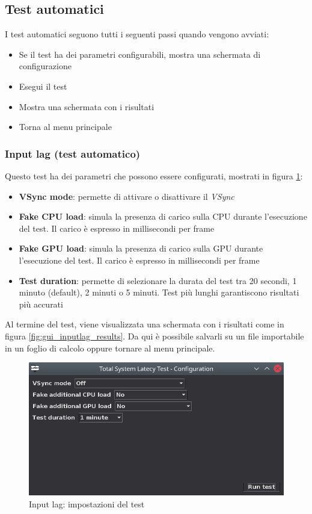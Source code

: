 \subsection{Test automatici}
I test automatici seguono tutti i seguenti passi quando vengono avviati:\begin{itemize}
	\item Se il test ha dei parametri configurabili, mostra una schermata di configurazione
	\item Esegui il test
	\item Mostra una schermata con i risultati
	\item Torna al menu principale
\end{itemize}

\subsubsection{Input lag (test automatico)}
Questo test ha dei parametri che possono essere configurati, mostrati in figura \ref{fig:gui_inputlag_settings}:\begin{itemize}
	\item \textbf{VSync mode}: permette di attivare o disattivare il \textit{VSync}
	\item \textbf{Fake CPU load}: simula la presenza di carico sulla CPU durante l'esecuzione del test. Il carico è espresso in millisecondi per frame
	\item \textbf{Fake GPU load}: simula la presenza di carico sulla GPU durante l'esecuzione del test. Il carico è espresso in millisecondi per frame
	\item \textbf{Test duration}: permette di selezionare la durata del test tra 20 secondi, 1 minuto (default), 2 minuti o 5 minuti. Test più lunghi garantiscono risultati più accurati
\end{itemize}

Al termine del test, viene visualizzata una schermata con i risultati come in figura \ref{fig:gui_inputlag_results}. Da qui è possibile salvarli su un file importabile in un foglio di calcolo oppure tornare al menu principale.

\begin{figure}[H]
	\centering
	\includegraphics[width=.8\textwidth]{Applicazione_files/gui_inputlag_settings.png}
	\caption{Input lag: impostazioni del test}
	\label{fig:gui_inputlag_settings}
\end{figure}


